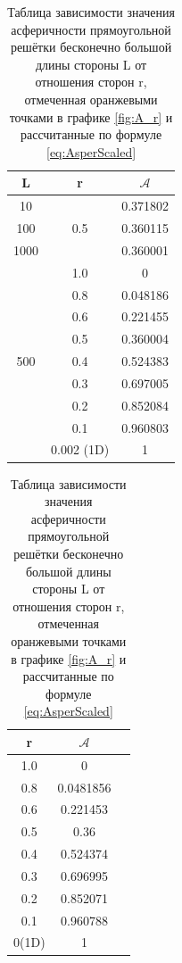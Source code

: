 \begin{table}[h!]
    \begin{minipage}{0.45\textwidth}
    \centering
    \begin{tabular}{|c|c|c|} 
    \hline
        L & r & $\mathcal{A}$ \\ \hline
        10 & \multirow{3}{*}{0.5}  &  0.371802 \\ \hhline{-~-}
        100 & & 0.360115 \\ \hhline{-~-}
        1000 &  & 0.360001 \\ \hline
        \multirow{9}{*}{500} & 1.0 & 0 \\ \hhline{~--}
        & 0.8 & 0.048186 \\\hhline{~--}
        & 0.6 & 0.221455 \\\hhline{~--}
        &0.5 & 0.360004 \\\hhline{~--}
        &0.4 & 0.524383 \\\hhline{~--}
        &0.3 & 0.697005 \\\hhline{~--}
        &0.2 & 0.852084 \\\hhline{~--}
        &0.1 & 0.960803 \\\hhline{~--}
        &0.002 (1D) & 1 \\\hline
    \end{tabular}
    \caption{Таблица зависимости значения асферичности прямоугольной решётки от стороны L и отношения сторон r. Значения для длины 500 соответствуют значениям из графика \ref{fig:A_r}}
    \label{tab:A_L_r}    
    \end{minipage}
    \hfill
    \begin{minipage}{0.45\textwidth}
    \centering
    \begin{tabular}{|c|c|c|} 
    \hline
        r & $\mathcal{A}$ \\ \hline
        1.0 & 0 \\ \hline
        0.8 & 0.0481856 \\\hline
        0.6 & 0.221453 \\\hline
        0.5 & 0.36 \\\hline
        0.4 & 0.524374 \\\hline
        0.3 & 0.696995 \\\hline
        0.2 & 0.852071 \\\hline
        0.1 & 0.960788 \\\hline
        0(1D) & 1 \\\hline
    \end{tabular}
    \caption{Таблица зависимости значения асферичности прямоугольной решётки бесконечно большой длины стороны L от отношения сторон r, отмеченная оранжевыми точками в графике \ref{fig:A_r} и рассчитанные по формуле \eqref{eq:AsperScaled}}
    \label{tab:A_L_r}    
    \end{minipage}
\end{table}

